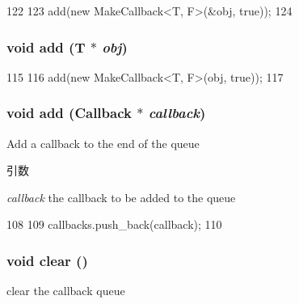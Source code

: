 \begin{DoxyCode}
122     {
123         add(new MakeCallback<T, F>(&obj, true));
124     }
\end{DoxyCode}
\hypertarget{classCallbackQueue_ae5e7961583b6a941534052a0dc3f4ff2}{
\subsubsection[{add}]{\setlength{\rightskip}{0pt plus 5cm}void add (T $\ast$ {\em obj})}}
\label{classCallbackQueue_ae5e7961583b6a941534052a0dc3f4ff2}



\begin{DoxyCode}
115     {
116         add(new MakeCallback<T, F>(obj, true));
117     }
\end{DoxyCode}
\hypertarget{classCallbackQueue_ac5718710d8be5c000db17f6a185a8929}{
\subsubsection[{add}]{\setlength{\rightskip}{0pt plus 5cm}void add ({\bf Callback} $\ast$ {\em callback})}}
\label{classCallbackQueue_ac5718710d8be5c000db17f6a185a8929}
Add a callback to the end of the queue 
\begin{DoxyParams}{引数}
\item[{\em callback}]the callback to be added to the queue \end{DoxyParams}



\begin{DoxyCode}
108     {
109         callbacks.push_back(callback);
110     }
\end{DoxyCode}
\hypertarget{classCallbackQueue_ac8bb3912a3ce86b15842e79d0b421204}{
\subsubsection[{clear}]{\setlength{\rightskip}{0pt plus 5cm}void clear ()}}
\label{classCallbackQueue_ac8bb3912a3ce86b15842e79d0b421204}
clear the callback queue 


